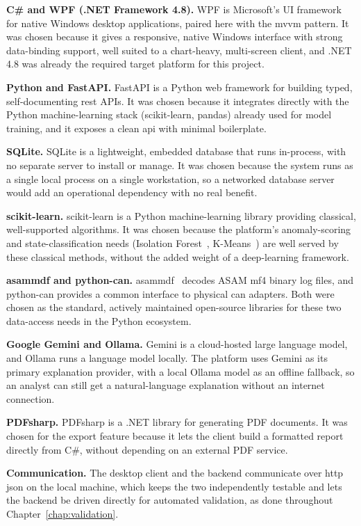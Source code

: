 \textbf{C\# and WPF (.NET Framework 4.8).} WPF is Microsoft's UI framework for native Windows desktop applications, paired here with the \gls{mvvm} pattern. It was chosen because it gives a responsive, native Windows interface with strong data-binding support, well suited to a chart-heavy, multi-screen client, and .NET 4.8 was already the required target platform for this project.

\textbf{Python and FastAPI.} FastAPI is a Python web framework for building typed, self-documenting \gls{rest} APIs. It was chosen because it integrates directly with the Python machine-learning stack (scikit-learn, pandas) already used for model training, and it exposes a clean \gls{api} with minimal boilerplate.

\textbf{SQLite.} SQLite is a lightweight, embedded database that runs in-process, with no separate server to install or manage. It was chosen because the system runs as a single local process on a single workstation, so a networked database server would add an operational dependency with no real benefit.

\textbf{scikit-learn.} scikit-learn is a Python machine-learning library providing classical, well-supported algorithms. It was chosen because the platform's anomaly-scoring and state-classification needs (Isolation Forest~\cite{liu2008isolation}, K-Means~\cite{macqueen1967methods}) are well served by these classical methods, without the added weight of a deep-learning framework.

\textbf{asammdf and python-can.} asammdf~\cite{asam_mdf} decodes ASAM \gls{mf4} binary log files, and python-can provides a common interface to physical \gls{can} adapters. Both were chosen as the standard, actively maintained open-source libraries for these two data-access needs in the Python ecosystem.

\textbf{Google Gemini and Ollama.} Gemini is a cloud-hosted large language model, and Ollama runs a language model locally. The platform uses Gemini as its primary explanation provider, with a local Ollama model as an offline fallback, so an analyst can still get a natural-language explanation without an internet connection.

\textbf{PDFsharp.} PDFsharp is a .NET library for generating PDF documents. It was chosen for the export feature because it lets the client build a formatted report directly from C\#, without depending on an external PDF service.

\textbf{Communication.} The desktop client and the backend communicate over \gls{http} \gls{json} on the local machine, which keeps the two independently testable and lets the backend be driven directly for automated validation, as done throughout Chapter~\ref{chap:validation}.

